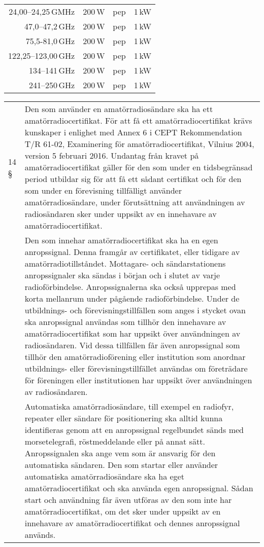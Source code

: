 \begin{tabular}{rrlr}
	   24,00--24,25\,GMHz &          200\,W & pep            &            1\,kW \\
	      47,0--47,2\,GHz &          200\,W & pep            &            1\,kW \\
	       75,5-81,0\,GHz &          200\,W & pep            &            1\,kW \\
	  122,25--123,00\,GHz &          200\,W & pep            &            1\,kW \\
	        134--141\,GHz &          200\,W & pep            &            1\,kW \\
	        241--250\,GHz &          200\,W & pep            &            1\,kW
\end{tabular}

\begin{tabularx}{\columnwidth}{lX}
	14 § & Den som använder en amatörradiosändare ska ha ett amatörradiocertifikat.
	För att få ett amatörradiocertifikat krävs kunskaper i enlighet med Annex 6 i
	CEPT Rekommendation T/R 61-02, Examinering för amatörradiocertifikat, Vilnius 2004, version 5 februari 2016. Undantag från kravet på amatörradiocertifikat gäller för den som under en tidsbegränsad period utbildar sig för att få ett
	sådant certifikat och för den som under en förevisning tillfälligt använder amatörradiosändare, under förutsättning att användningen av radiosändaren sker under
	uppsikt av en innehavare av amatörradiocertifikat.\vspace{1ex}\\
	
	&Den som innehar amatörradiocertifikat ska ha en egen anropssignal. Denna
	framgår av certifikatet, eller tidigare av amatörradiotillståndet. Mottagare- och
	sändarstationens anropssignaler ska sändas i början och i slutet av varje radioförbindelse. Anropssignalerna ska också upprepas med korta mellanrum under
	pågående radioförbindelse. Under de utbildnings- och förevisningstillfällen som
	anges i stycket ovan ska anropssignal användas som tillhör den innehavare av
	amatörradiocertifikat som har uppsikt över användningen av radiosändaren. Vid
	dessa tillfällen får även anropssignal som tillhör den amatörradioförening eller
	institution som anordnar utbildnings- eller förevisningstillfället användas om
	företrädare för föreningen eller institutionen har uppsikt över användningen av
	radiosändaren.\vspace{1ex}\\
	
	&Automatiska amatörradiosändare, till exempel en radiofyr, repeater eller sändare för positionering ska alltid kunna identifieras genom att en anropssignal
	regelbundet sänds med morsetelegrafi, röstmeddelande eller på annat sätt.
	Anropssignalen ska ange vem som är ansvarig för den automatiska sändaren. Den
	som startar eller använder automatiska amatörradiosändare ska ha eget amatörradiocertifikat och ska använda egen anropssignal. Sådan start och användning får
	även utföras av den som inte har amatörradiocertifikat, om det sker under uppsikt
	av en innehavare av amatörradiocertifikat och dennes anropssignal används. 
	\vspace{1ex}\\
\end{tabularx}

